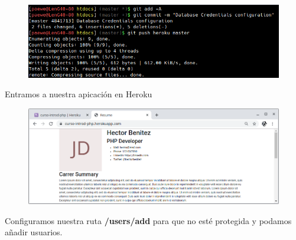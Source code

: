 \documentclass{article}
\begin{document}
\begin{figure}[h!]
  \centering
  \includegraphics[scale=0.5]{./Pictures/281_project_credentials.png}
\end{figure}

Entramos a nuestra apicación en Heroku

\begin{figure}[h!]
  \centering
  \includegraphics[scale=0.5]{./Pictures/282_app_sin_css.png}
\end{figure}

Configuramos nuestra ruta \textbf{/users/add} para que no esté protegida y
podamos añadir usuarios.
\end{document}
